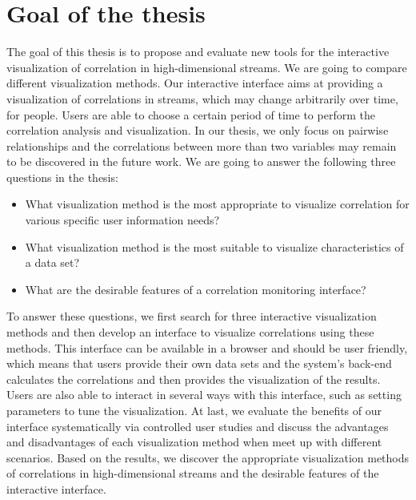 \section{Goal of the thesis}
\label{sec:Introduction:GoalOfTheThesis}
The goal of this thesis is to propose and evaluate new tools for the interactive visualization of correlation in high-dimensional streams. We are going to compare different visualization methods. Our interactive interface aims at providing a visualization of correlations in streams, which may change arbitrarily over time, for people. Users are able to choose a certain period of time to perform the correlation analysis and visualization. In our thesis, we only focus on pairwise relationships and the correlations between more than two variables may remain to be discovered in the future work. We are going to answer the following three questions in the thesis:
\begin{itemize}
	\item What visualization method is the most appropriate to visualize correlation for various specific user information needs?
	\item What visualization method is the most suitable to visualize characteristics of a data set?
	\item What are the desirable features of a correlation monitoring interface?
\end{itemize}
To answer these questions, we first search for three interactive visualization methods and then develop an interface to visualize correlations using these methods. This interface can be available in a browser and should be user friendly, which means that users provide their own data sets and the system’s back-end calculates the correlations and then provides the visualization of the results. Users are also able to interact in several ways with this interface, such as setting parameters to tune the visualization. At last, we evaluate the benefits of our interface systematically via controlled user studies and discuss the advantages and disadvantages of each visualization method when meet up with different scenarios. Based on the results, we discover the appropriate visualization methods of correlations in high-dimensional streams and the desirable features of the interactive interface.\\
